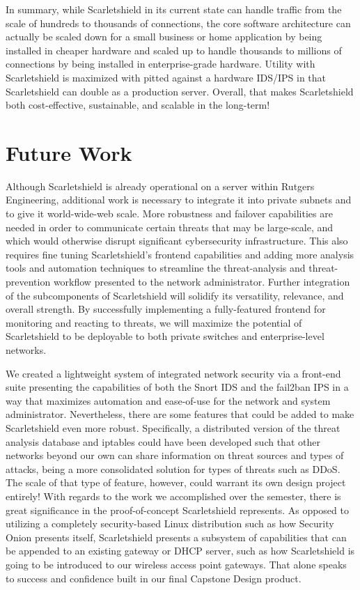 \documentclass[12pt,letterpaper,titlepage]{report}
\begin{document}
{In summary, while Scarletshield in its current state can handle traffic from the
scale of hundreds to thousands of connections, the core software architecture
can actually be scaled down for a small business or home application by being
installed in cheaper hardware and scaled up to handle thousands to millions of
connections by being installed in enterprise-grade hardware.  Utility with
Scarletshield is maximized with pitted against a hardware IDS/IPS in that
Scarletshield can double as a production server.  Overall, that makes
Scarletshield both cost-effective, sustainable, and scalable in the long-term!


\section{Future Work}

Although Scarletshield is already operational on a server within Rutgers
Engineering, additional work is necessary to integrate it into private subnets
and to give it world-wide-web scale. More robustness and failover capabilities
are needed in order to communicate certain threats that may be large-scale, and
which would otherwise disrupt significant cybersecurity infrastructure. This
also requires fine tuning Scarletshield’s frontend capabilities and adding more
analysis tools and automation techniques to streamline the threat-analysis and
threat-prevention workflow presented to the network administrator.  Further
integration of the subcomponents of Scarletshield will solidify its versatility,
relevance, and overall strength.  By successfully implementing a fully-featured
frontend for monitoring and reacting to threats, we will maximize the potential
of Scarletshield to be deployable to both private switches and enterprise-level
networks.

We created a lightweight system of integrated network security via a front-end suite 
presenting the capabilities of both the Snort IDS and the fail2ban IPS in a way that
maximizes automation and ease-of-use for the network and system administrator.  
Nevertheless, there are some features that could be added to make Scarletshield even more robust.  
Specifically, a distributed version of the threat analysis database and iptables could have 
been developed such that other networks beyond our own can share information on threat sources 
and types of attacks, being a more consolidated solution for types of threats such as DDoS. 
The scale of that type of feature, however, could warrant its own design project entirely!  
With regards to the work we accomplished over the semester, there is great significance in the
proof-of-concept Scarletshield represents. As opposed to utilizing a completely security-based
Linux distribution such as how Security Onion presents itself, Scarletshield presents a subsystem
of capabilities that can be appended to an existing gateway or DHCP server, such as how
Scarletshield is going to be introduced to our wireless access point gateways.  
That alone speaks to success and confidence built in our final Capstone Design product.

}
\end{document}
